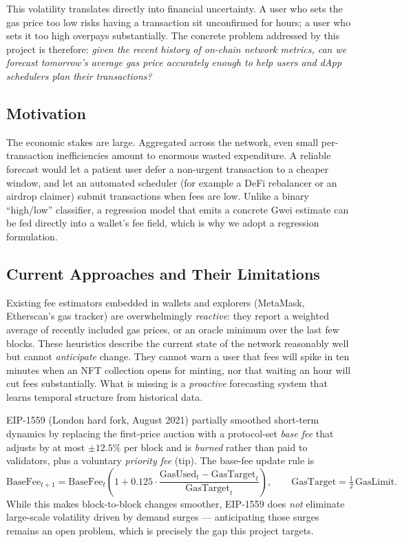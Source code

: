 \documentclass[11pt,a4paper]{article}
\begin{document}
This volatility translates directly into financial uncertainty. A user who sets the gas price
too low risks having a transaction sit unconfirmed for hours; a user who sets it too high
overpays substantially. The concrete problem addressed by this project is therefore:
\emph{given the recent history of on-chain network metrics, can we forecast tomorrow's average
gas price accurately enough to help users and dApp schedulers plan their transactions?}

\subsection{Motivation}
The economic stakes are large. Aggregated across the network, even small per-transaction
inefficiencies amount to enormous wasted expenditure. A reliable forecast would let a patient
user defer a non-urgent transaction to a cheaper window, and let an automated scheduler (for
example a DeFi rebalancer or an airdrop claimer) submit transactions when fees are low. Unlike
a binary ``high/low'' classifier, a regression model that emits a concrete Gwei estimate can be
fed directly into a wallet's fee field, which is why we adopt a regression formulation.

\subsection{Current Approaches and Their Limitations}
Existing fee estimators embedded in wallets and explorers (MetaMask, Etherscan's gas tracker)
are overwhelmingly \emph{reactive}: they report a weighted average of recently included gas
prices, or an oracle minimum over the last few blocks. These heuristics describe the current
state of the network reasonably well but cannot \emph{anticipate} change. They cannot warn a
user that fees will spike in ten minutes when an NFT collection opens for minting, nor that
waiting an hour will cut fees substantially. What is missing is a \emph{proactive} forecasting
system that learns temporal structure from historical data.

EIP-1559 (London hard fork, August 2021) partially smoothed short-term dynamics by replacing
the first-price auction with a protocol-set \emph{base fee} that adjusts by at most $\pm12.5\%$
per block and is \emph{burned} rather than paid to validators, plus a voluntary \emph{priority
fee} (tip). The base-fee update rule is
\begin{equation}
\mathrm{BaseFee}_{t+1} = \mathrm{BaseFee}_{t}\left(1 + 0.125\cdot
\frac{\mathrm{GasUsed}_t - \mathrm{GasTarget}_t}{\mathrm{GasTarget}_t}\right),
\qquad \mathrm{GasTarget} = \tfrac{1}{2}\,\mathrm{GasLimit}.
\end{equation}
While this makes block-to-block changes smoother, EIP-1559 does \emph{not} eliminate
large-scale volatility driven by demand surges --- anticipating those surges remains an open
problem, which is precisely the gap this project targets.
\end{document}
